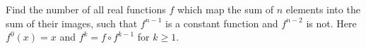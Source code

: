 Find the number of all real functions $f$ which map the sum of $n$ elements into the sum of their images, such that $f^{n-1}$ is a constant function and $f^{n-2}$ is not. Here $f^0(x) = x$ and $f^k = f \circ f^{k-1}$ for $k \ge 1$.